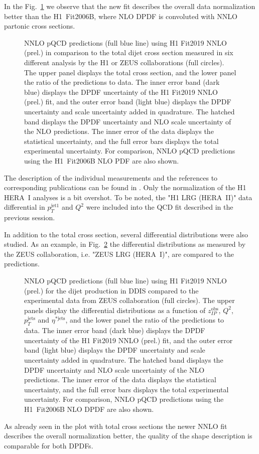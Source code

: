 \documentclass{PoS}
\newcommand{\IP}{I\!\!P}
\newcommand{\includegraphicss}[2][]{\fbox{\texttt{[image: \#2]}}}
\begin{document}
In the Fig.~\ref{figTotalXsecs} we observe that the new fit describes the overall data normalization better than the H1~Fit2006B, where NLO DPDF is convoluted with NNLO partonic cross sections.
%
\begin{figure}[h]
\centering
\includegraphicss[trim={0cm 1.7cm 0 0.7cm},clip,width=.6\textwidth]{{{plots/H1prelim-19-013.fig3}}}
\caption{ NNLO pQCD predictions (full blue line) using H1 Fit2019 NNLO (prel.) in comparison to the total dijet cross section measured in six different analysis by the H1 or ZEUS collaborations (full circles). The upper panel displays the total cross section, and the lower panel the ratio of the predictions to data. The inner error band (dark blue) displays the DPDF uncertainty of the H1 Fit2019 NNLO (prel.) fit, and the outer error band (light blue) displays the DPDF uncertainty and scale uncertainty added in quadrature. The hatched band displays the DPDF uncertainty and NLO scale uncertainty of the NLO predictions. The inner error of the data displays the statistical uncertainty, and the full error bars displays the total experimental uncertainty. For comparison, NNLO pQCD predictions using the H1~Fit2006B NLO PDF are also shown.}
\label{figTotalXsecs}
\end{figure}
%
The description of the individual measurements and the references to corresponding publications can be found in \cite{Britzger:2018zvv}.
Only the normalization of the H1 HERA~I analyses is a bit overshot.
To be noted, the "H1 LRG (HERA~II)" data differential in $p_T^{\mathrm{jet}1}$ and $Q^2$ were included into the QCD fit described in the previous session.

In addition to the total cross section, several differential distributions were also studied.
As an example, in Fig.~\ref{figZEUSdiff} the differential distributions as measured by the ZEUS collaboration, i.e. "ZEUS LRG (HERA~I)", are compared to the predictions.
\begin{figure}[h]
\centering
\includegraphicss[trim={0cm 0.3cm 0 0.3cm},clip,width=.8\textwidth]{{{plots/H1prelim-19-013.fig7}}}
\caption{ NNLO pQCD predictions (full blue line) using H1 Fit2019 NNLO (prel.) for the dijet production in DDIS compared to the experimental data from ZEUS collaboration (full circles). The upper panels display the differential distributions as a function of $z_{\IP}^\mathrm{obs}$, $Q^2$, $p_T^\mathrm{jets}$ and $\eta^{*\mathrm{jets}}$, and the lower panel the ratio of the predictions to data. The inner error band (dark blue) displays the DPDF uncertainty of the H1 Fit2019 NNLO (prel.) fit, and the outer error band (light blue) displays the DPDF uncertainty and scale uncertainty added in quadrature. The hatched band displays the DPDF uncertainty and NLO scale uncertainty of the NLO predictions. The inner error of the data displays the statistical uncertainty, and the full error bars displays the total experimental uncertainty. For comparison, NNLO pQCD predictions using the H1~Fit2006B NLO DPDF are also shown.}
\label{figZEUSdiff}
\end{figure}
As already seen in the plot with total cross sections the newer NNLO fit describes the overall normalization better, the quality of the shape description is comparable for both DPDFs.
\end{document}
